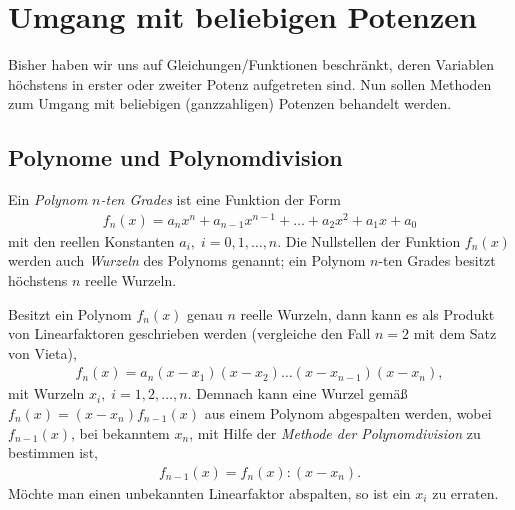 \thispagestyle{plain}
\section{Umgang mit beliebigen Potenzen}

Bisher haben wir uns auf Gleichungen/Funktionen beschränkt, deren Variablen höchstens in erster oder zweiter Potenz aufgetreten sind. Nun sollen Methoden zum Umgang mit beliebigen (ganzzahligen) Potenzen behandelt werden. 

\subsection{Polynome und Polynomdivision}

Ein \emph{Polynom} $n$\emph{-ten Grades} ist eine Funktion der Form 
\begin{align}
    f_n(x) = a_n x^n + a_{n-1} x^{n-1} + \hdots + a_2 x^2 + a_1 x + a_0
\end{align}
mit den reellen Konstanten $a_i,\; i = 0,1,\hdots,n$. Die Nullstellen der Funktion $f_n(x)$ werden auch \emph{Wurzeln} des Polynoms genannt; ein Polynom $n$-ten Grades besitzt höchstens $n$ reelle Wurzeln. 

Besitzt ein Polynom $f_n(x)$ genau $n$ reelle Wurzeln, dann kann es als Produkt von Linearfaktoren geschrieben werden (vergleiche den Fall $n=2$ mit dem Satz von Vieta), 
\begin{align}
    f_n(x) = a_n (x-x_1)(x-x_2)\hdots (x-x_{n-1})(x-x_n),
\end{align}
mit Wurzeln $x_i, \; i=1,2,\hdots,n$. Demnach kann eine Wurzel gemäß $f_n(x) = (x-x_n)f_{n-1}(x)$ aus einem Polynom abgespalten werden, wobei $f_{n-1}(x)$, bei bekanntem $x_n$, mit Hilfe der \emph{Methode der Polynomdivision} zu bestimmen ist,
\begin{align}
    f_{n-1}(x) = f_n(x) : (x-x_n).
\end{align}
Möchte man einen unbekannten Linearfaktor abspalten, so ist ein $x_i$ zu erraten.

